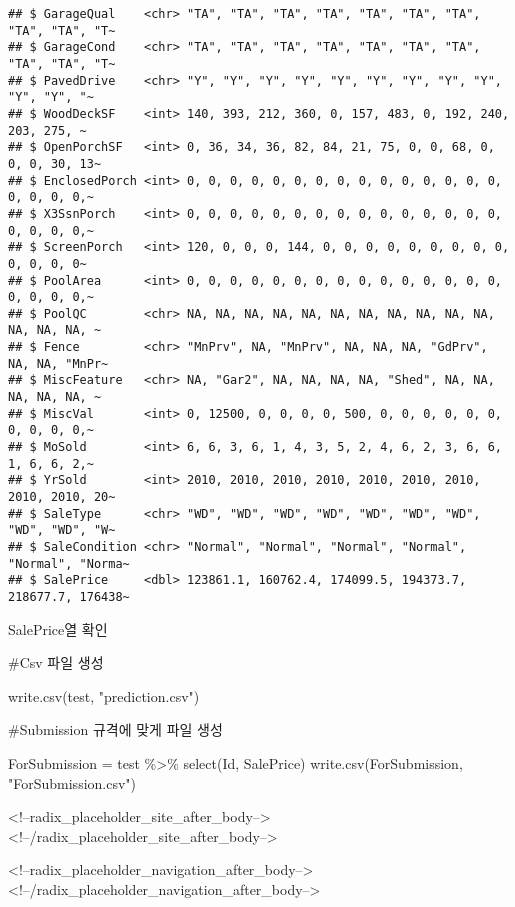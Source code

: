 \documentclass[
]{article}
\newenvironment{Shaded}{\begin{snugshade}}{\end{snugshade}}
\newcommand{\FunctionTok}[1]{\textcolor[rgb]{0.00,0.00,0.00}{#1}}
\newcommand{\NormalTok}[1]{#1}
\newcommand{\OtherTok}[1]{\textcolor[rgb]{0.56,0.35,0.01}{#1}}
\newcommand{\SpecialCharTok}[1]{\textcolor[rgb]{0.00,0.00,0.00}{#1}}
\newcommand{\StringTok}[1]{\textcolor[rgb]{0.31,0.60,0.02}{#1}}
\begin{document}
\begin{verbatim}
## $ GarageQual    <chr> "TA", "TA", "TA", "TA", "TA", "TA", "TA", "TA", "TA", "T~
## $ GarageCond    <chr> "TA", "TA", "TA", "TA", "TA", "TA", "TA", "TA", "TA", "T~
## $ PavedDrive    <chr> "Y", "Y", "Y", "Y", "Y", "Y", "Y", "Y", "Y", "Y", "Y", "~
## $ WoodDeckSF    <int> 140, 393, 212, 360, 0, 157, 483, 0, 192, 240, 203, 275, ~
## $ OpenPorchSF   <int> 0, 36, 34, 36, 82, 84, 21, 75, 0, 0, 68, 0, 0, 0, 30, 13~
## $ EnclosedPorch <int> 0, 0, 0, 0, 0, 0, 0, 0, 0, 0, 0, 0, 0, 0, 0, 0, 0, 0, 0,~
## $ X3SsnPorch    <int> 0, 0, 0, 0, 0, 0, 0, 0, 0, 0, 0, 0, 0, 0, 0, 0, 0, 0, 0,~
## $ ScreenPorch   <int> 120, 0, 0, 0, 144, 0, 0, 0, 0, 0, 0, 0, 0, 0, 0, 0, 0, 0~
## $ PoolArea      <int> 0, 0, 0, 0, 0, 0, 0, 0, 0, 0, 0, 0, 0, 0, 0, 0, 0, 0, 0,~
## $ PoolQC        <chr> NA, NA, NA, NA, NA, NA, NA, NA, NA, NA, NA, NA, NA, NA, ~
## $ Fence         <chr> "MnPrv", NA, "MnPrv", NA, NA, NA, "GdPrv", NA, NA, "MnPr~
## $ MiscFeature   <chr> NA, "Gar2", NA, NA, NA, NA, "Shed", NA, NA, NA, NA, NA, ~
## $ MiscVal       <int> 0, 12500, 0, 0, 0, 0, 500, 0, 0, 0, 0, 0, 0, 0, 0, 0, 0,~
## $ MoSold        <int> 6, 6, 3, 6, 1, 4, 3, 5, 2, 4, 6, 2, 3, 6, 6, 1, 6, 6, 2,~
## $ YrSold        <int> 2010, 2010, 2010, 2010, 2010, 2010, 2010, 2010, 2010, 20~
## $ SaleType      <chr> "WD", "WD", "WD", "WD", "WD", "WD", "WD", "WD", "WD", "W~
## $ SaleCondition <chr> "Normal", "Normal", "Normal", "Normal", "Normal", "Norma~
## $ SalePrice     <dbl> 123861.1, 160762.4, 174099.5, 194373.7, 218677.7, 176438~
\end{verbatim}

SalePrice열 확인

\#Csv 파일 생성

\begin{Shaded}
\begin{Highlighting}[]
\FunctionTok{write.csv}\NormalTok{(test, }\StringTok{"prediction.csv"}\NormalTok{)}
\end{Highlighting}
\end{Shaded}

\#Submission 규격에 맞게 파일 생성

\begin{Shaded}
\begin{Highlighting}[]
\NormalTok{ForSubmission }\OtherTok{=}\NormalTok{ test }\SpecialCharTok{\%\textgreater{}\%} \FunctionTok{select}\NormalTok{(Id, SalePrice)}
\FunctionTok{write.csv}\NormalTok{(ForSubmission, }\StringTok{"ForSubmission.csv"}\NormalTok{)}
\end{Highlighting}
\end{Shaded}


<!--radix_placeholder_site_after_body-->
<!--/radix_placeholder_site_after_body-->

<!--radix_placeholder_navigation_after_body-->
<!--/radix_placeholder_navigation_after_body-->
\end{document}
